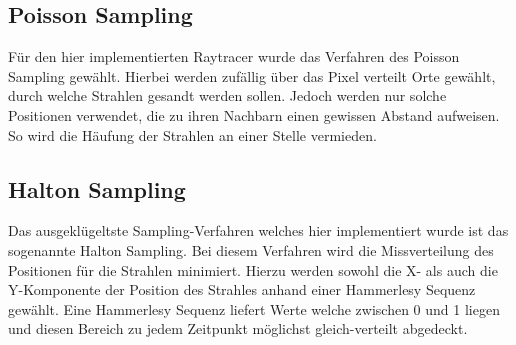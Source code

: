 \documentclass[a4paper]{article}
\begin{document}
\subsection*{Poisson Sampling}
Für den hier implementierten Raytracer wurde das Verfahren des Poisson Sampling gewählt. Hierbei werden zufällig über das Pixel verteilt Orte gewählt, durch welche Strahlen gesandt werden sollen. Jedoch werden nur solche Positionen verwendet, die zu ihren Nachbarn einen gewissen Abstand aufweisen. So wird die Häufung der Strahlen an einer Stelle vermieden.

\subsection*{Halton Sampling}
Das ausgeklügeltste Sampling-Verfahren welches hier implementiert wurde ist das sogenannte Halton Sampling. Bei diesem Verfahren wird die Missverteilung des Positionen für die Strahlen minimiert. Hierzu werden sowohl die X- als auch die Y-Komponente der Position des Strahles anhand einer Hammerlesy Sequenz gewählt. Eine Hammerlesy Sequenz liefert Werte welche zwischen 0 und 1 liegen und diesen Bereich zu jedem Zeitpunkt möglichst gleich-verteilt abgedeckt.
\end{document}

